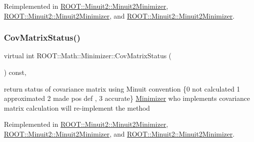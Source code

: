 Reimplemented in \mbox{\hyperlink{classROOT_1_1Minuit2_1_1Minuit2Minimizer_ad9f4873b9651626d2b83cf7eab826b0f}{R\+O\+O\+T\+::\+Minuit2\+::\+Minuit2\+Minimizer}}, \mbox{\hyperlink{classROOT_1_1Minuit2_1_1Minuit2Minimizer_ad9f4873b9651626d2b83cf7eab826b0f}{R\+O\+O\+T\+::\+Minuit2\+::\+Minuit2\+Minimizer}}, and \mbox{\hyperlink{classROOT_1_1Minuit2_1_1Minuit2Minimizer_ad9f4873b9651626d2b83cf7eab826b0f}{R\+O\+O\+T\+::\+Minuit2\+::\+Minuit2\+Minimizer}}.

\mbox{\label{classROOT_1_1Math_1_1Minimizer_a5f5eab490760ff361d9c44369e9d754d}} 
\subsubsection{\texorpdfstring{CovMatrixStatus()}{CovMatrixStatus()}\hspace{0.1cm}{\footnotesize\ttfamily [2/3]}}
{\footnotesize\ttfamily virtual int R\+O\+O\+T\+::\+Math\+::\+Minimizer\+::\+Cov\+Matrix\+Status (\begin{DoxyParamCaption}{ }\end{DoxyParamCaption}) const\hspace{0.3cm}{\ttfamily [inline]}, {\ttfamily [virtual]}}

return status of covariance matrix using Minuit convention \{0 not calculated 1 approximated 2 made pos def , 3 accurate\} \mbox{\hyperlink{classROOT_1_1Math_1_1Minimizer}{Minimizer}} who implements covariance matrix calculation will re-\/implement the method 

Reimplemented in \mbox{\hyperlink{classROOT_1_1Minuit2_1_1Minuit2Minimizer_ad9f4873b9651626d2b83cf7eab826b0f}{R\+O\+O\+T\+::\+Minuit2\+::\+Minuit2\+Minimizer}}, \mbox{\hyperlink{classROOT_1_1Minuit2_1_1Minuit2Minimizer_ad9f4873b9651626d2b83cf7eab826b0f}{R\+O\+O\+T\+::\+Minuit2\+::\+Minuit2\+Minimizer}}, and \mbox{\hyperlink{classROOT_1_1Minuit2_1_1Minuit2Minimizer_ad9f4873b9651626d2b83cf7eab826b0f}{R\+O\+O\+T\+::\+Minuit2\+::\+Minuit2\+Minimizer}}.

\mbox{\label{classROOT_1_1Math_1_1Minimizer_a5f5eab490760ff361d9c44369e9d754d}} 
